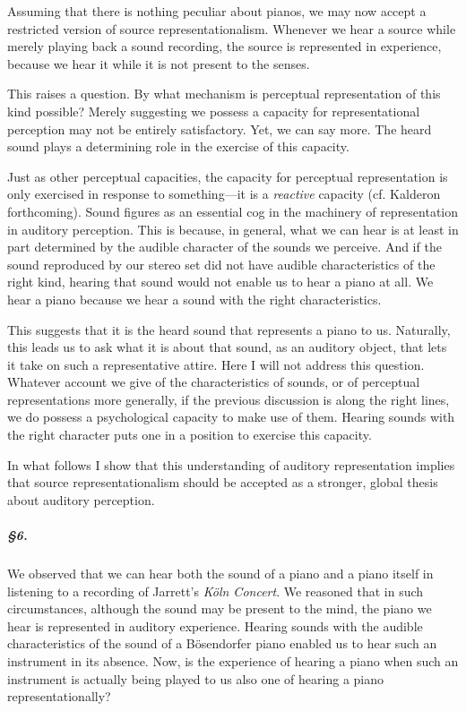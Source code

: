 \documentclass[sloppy, journal, git, anonymise]{humapap}
\begin{document}
Assuming that there is nothing peculiar about pianos, we may now accept
a restricted version of source representationalism. Whenever we hear a
source while merely playing back a sound recording, the source is
represented in experience, because we hear it while it is not present to
the senses.

This raises a question. By what mechanism is perceptual representation
of this kind possible? Merely suggesting we possess a capacity for
representational perception may not be entirely satisfactory. Yet, we
can say more. The heard sound plays a determining role in the exercise
of this capacity.

Just as other perceptual capacities, the capacity for perceptual
representation is only exercised in response to something---it is a
\emph{reactive} capacity (cf. Kalderon forthcoming). Sound figures as an
essential cog in the machinery of representation in auditory perception.
This is because, in general, what we can hear is at least in part
determined by the audible character of the sounds we perceive. And if
the sound reproduced by our stereo set did not have audible
characteristics of the right kind, hearing that sound would not enable
us to hear a piano at all. We hear a piano because we hear a sound with
the right characteristics.

This suggests that it is the heard sound that represents a piano to us.
Naturally, this leads us to ask what it is about that sound, as an
auditory object, that lets it take on such a representative attire. Here
I will not address this question. Whatever account we give of the
characteristics of sounds, or of perceptual representations more
generally, if the previous discussion is along the right lines, we do
possess a psychological capacity to make use of them. Hearing sounds
with the right character puts one in a position to exercise this
capacity.

In what follows I show that this understanding of auditory
representation implies that source representationalism should be
accepted as a stronger, global thesis about auditory perception.

\subparagraph{§6.}\label{section-5}

We observed that we can hear both the sound of a piano and a piano
itself in listening to a recording of Jarrett's \emph{Köln Concert}. We
reasoned that in such circumstances, although the sound may be present
to the mind, the piano we hear is represented in auditory experience.
Hearing sounds with the audible characteristics of the sound of a
Bösendorfer piano enabled us to hear such an instrument in its absence.
Now, is the experience of hearing a piano when such an instrument is
actually being played to us also one of hearing a piano
representationally?
\end{document}
